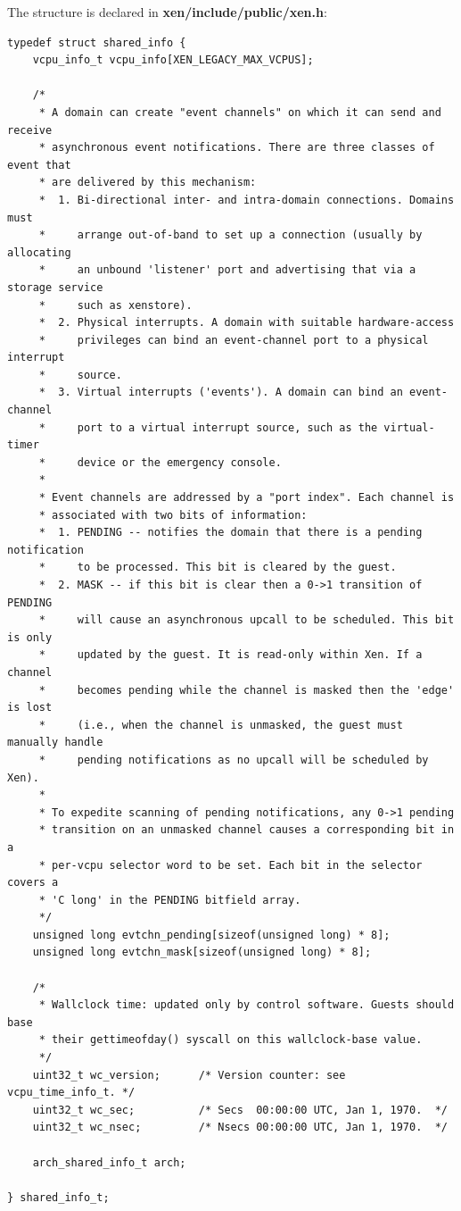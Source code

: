 \documentclass[11pt,twoside,final,openright,a4paper]{report}
\begin{document}
The structure is declared in {\bf xen/include/public/xen.h}:

\scriptsize
\begin{verbatim}
typedef struct shared_info {
    vcpu_info_t vcpu_info[XEN_LEGACY_MAX_VCPUS];

    /*
     * A domain can create "event channels" on which it can send and receive
     * asynchronous event notifications. There are three classes of event that
     * are delivered by this mechanism:
     *  1. Bi-directional inter- and intra-domain connections. Domains must
     *     arrange out-of-band to set up a connection (usually by allocating
     *     an unbound 'listener' port and advertising that via a storage service
     *     such as xenstore).
     *  2. Physical interrupts. A domain with suitable hardware-access
     *     privileges can bind an event-channel port to a physical interrupt
     *     source.
     *  3. Virtual interrupts ('events'). A domain can bind an event-channel
     *     port to a virtual interrupt source, such as the virtual-timer
     *     device or the emergency console.
     * 
     * Event channels are addressed by a "port index". Each channel is
     * associated with two bits of information:
     *  1. PENDING -- notifies the domain that there is a pending notification
     *     to be processed. This bit is cleared by the guest.
     *  2. MASK -- if this bit is clear then a 0->1 transition of PENDING
     *     will cause an asynchronous upcall to be scheduled. This bit is only
     *     updated by the guest. It is read-only within Xen. If a channel
     *     becomes pending while the channel is masked then the 'edge' is lost
     *     (i.e., when the channel is unmasked, the guest must manually handle
     *     pending notifications as no upcall will be scheduled by Xen).
     * 
     * To expedite scanning of pending notifications, any 0->1 pending
     * transition on an unmasked channel causes a corresponding bit in a
     * per-vcpu selector word to be set. Each bit in the selector covers a
     * 'C long' in the PENDING bitfield array.
     */
    unsigned long evtchn_pending[sizeof(unsigned long) * 8];
    unsigned long evtchn_mask[sizeof(unsigned long) * 8];

    /*
     * Wallclock time: updated only by control software. Guests should base
     * their gettimeofday() syscall on this wallclock-base value.
     */
    uint32_t wc_version;      /* Version counter: see vcpu_time_info_t. */
    uint32_t wc_sec;          /* Secs  00:00:00 UTC, Jan 1, 1970.  */
    uint32_t wc_nsec;         /* Nsecs 00:00:00 UTC, Jan 1, 1970.  */

    arch_shared_info_t arch;

} shared_info_t;
\end{verbatim}
\normalsize
\end{document}
